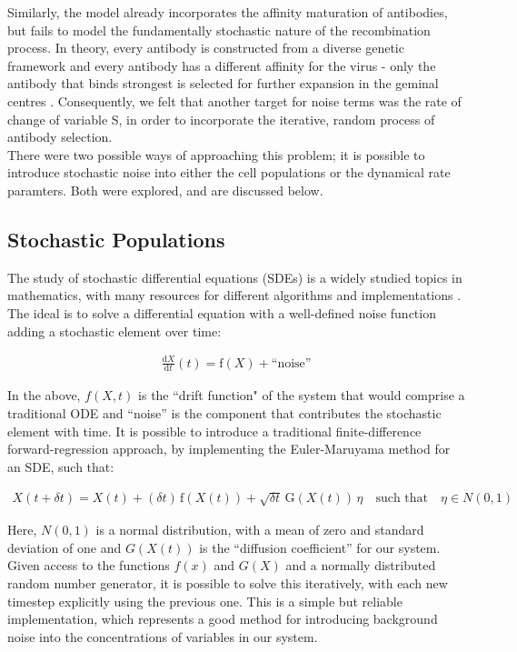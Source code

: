 \documentclass[a4paper, 12pt]{report}
\begin{document}
Similarly, the model already incorporates the affinity maturation of antibodies, but fails to model the fundamentally stochastic nature of the recombination process. In theory, every antibody is constructed from a diverse genetic framework and every antibody has a different affinity for the virus - only the antibody that binds strongest is selected for further expansion in the geminal centres \cite{Grimaldi15022005}. Consequently, we felt that another target for noise terms was the rate of change of variable S, in order to incorporate the iterative, random process of antibody selection.\\

There were two possible ways of approaching this problem; it is possible to introduce stochastic noise into either the cell populations or the dynamical rate paramters. Both were explored, and are discussed below.

\subsection{Stochastic Populations}

The study of stochastic differential equations (SDEs) is a widely studied topics in mathematics, with many resources for different algorithms and implementations \cite{2001}. The ideal is to solve a differential equation with a well-defined noise function adding a stochastic element over time:

\begin{align}
\frac{\mathrm d X}{\mathrm d t}(t) = \mathrm f (X) + \text{``noise''}
\end{align}

In the above, $f(X,t)$ is the ``drift function" of the system that would comprise a traditional ODE and ``noise'' is the component that contributes the stochastic element with time. It is possible to introduce a traditional finite-difference forward-regression approach, by implementing the Euler-Maruyama method for an SDE, such that:

\begin{align}
\label{eqn:eulerMaruyama}
X(t+\delta t) = X(t) + (\delta t)\, \mathrm f (X(t)) + \sqrt{ \delta t}\, \mathrm G (X(t))\, \eta \quad \text{such that} \quad \eta \in N(0,1)
\end{align}

Here, $N(0,1)$ is a normal distribution, with a mean of zero and standard deviation of one and $G(X(t))$ is the ``diffusion coefficient'' for our system. Given access to the functions $f(x)$ and $G(X)$ and a normally distributed random number generator, it is possible to solve this iteratively, with each new timestep explicitly using the previous one. This is a simple but reliable implementation, which represents a good method for introducing background noise into the concentrations of variables in our system.
\end{document}
